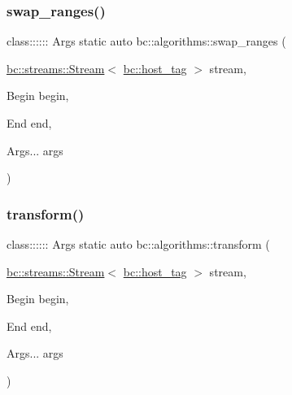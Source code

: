 \subsubsection{\texorpdfstring{swap\+\_\+ranges()}{swap\_ranges()}}
{\footnotesize\ttfamily class\+:::::: Args static auto bc\+::algorithms\+::swap\+\_\+ranges (\begin{DoxyParamCaption}\item[{\hyperlink{classbc_1_1streams_1_1Stream}{bc\+::streams\+::\+Stream}$<$ \hyperlink{structbc_1_1host__tag}{bc\+::host\+\_\+tag} $>$}]{stream,  }\item[{Begin}]{begin,  }\item[{End}]{end,  }\item[{Args...}]{args }\end{DoxyParamCaption})}

\mbox{\label{namespacebc_1_1algorithms_a56a3d18b6c2d6ece7a0b06c2583032d2}} 
\subsubsection{\texorpdfstring{transform()}{transform()}}
{\footnotesize\ttfamily class\+:::::: Args static auto bc\+::algorithms\+::transform (\begin{DoxyParamCaption}\item[{\hyperlink{classbc_1_1streams_1_1Stream}{bc\+::streams\+::\+Stream}$<$ \hyperlink{structbc_1_1host__tag}{bc\+::host\+\_\+tag} $>$}]{stream,  }\item[{Begin}]{begin,  }\item[{End}]{end,  }\item[{Args...}]{args }\end{DoxyParamCaption})}

